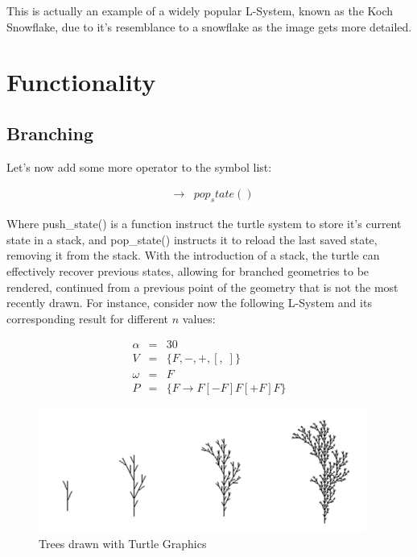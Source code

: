 \documentclass{acmtog}
\begin{document}
This is actually an example of a widely popular L-System, known as the Koch Snowflake, due to it's resemblance to a snowflake as the image gets more detailed.

\section{Functionality}
\label{sec:functionality}

\subsection{Branching}
\label{subsec:branching}

Let's now add some more operator to the symbol list:

\begin{eqnarray*}
    [ & \rightarrow &  push_state() \\
    ] & \rightarrow &  pop_state() 
\end{eqnarray*}

Where push\_state() is a function instruct the turtle system to store it's current state in a stack, and pop\_state() instructs it to reload the last saved state, removing it from the stack. With the introduction of a stack, the turtle can effectively recover previous states, allowing for branched geometries to be rendered, continued from a previous point of the geometry that is not the most recently drawn. For instance, consider now the following L-System and its corresponding result for different $n$ values:

\begin{eqnarray*}
  \alpha  &=& 30                         \\
  V       &=& \{F, -, +, [,\; ]\}        \\
  \omega  &=& F                           \\
  P       &=& \{F \rightarrow F[-F]F[+F]F\} 
\end{eqnarray*}

\begin{figure}[!htp]
  \begin{center}
    \includegraphics[width=\columnwidth]{images/3_tree}
    \caption{Trees drawn with Turtle Graphics \label{fig:tree}}
    \end{center}
\end{figure}
\end{document}
